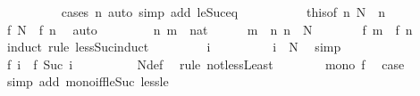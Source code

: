 \begin{isabellebody}
\ \ \ \ \ \ \ \ \isamarkupfalse%
\ {\isacharparenleft}{\kern0pt}cases\ n{\isacharparenright}{\kern0pt}\ {\isacharparenleft}{\kern0pt}auto\ simp\ add{\isacharcolon}{\kern0pt}\ le{\isacharunderscore}{\kern0pt}Suc{\isacharunderscore}{\kern0pt}eq{\isacharparenright}{\kern0pt}\isanewline
\ \ \ \ \isamarkupfalse%
\isanewline
\ \ \ \ \isamarkupfalse%
\ this{\isacharbrackleft}{\kern0pt}of\ n{\isacharbrackright}{\kern0pt}\ {\isacartoucheopen}N\ {\isasymle}\ n{\isacartoucheclose}\ \isamarkupfalse%
\ {\isachardoublequoteopen}f\ N\ {\isacharequal}{\kern0pt}\ f\ n{\isachardoublequoteclose}\ \isamarkupfalse%
\ auto\isanewline
\ \ \isamarkupfalse%
\isanewline
\ \ \ \ \isamarkupfalse%
\ n\ m\ {\isacharcolon}{\kern0pt}{\isacharcolon}{\kern0pt}\ nat\isanewline
\ \ \ \ \isamarkupfalse%
\ {\isachardoublequoteopen}m\ {\isacharless}{\kern0pt}\ n{\isachardoublequoteclose}\ {\isachardoublequoteopen}n\ {\isasymle}\ N{\isachardoublequoteclose}\isanewline
\ \ \ \ \isamarkupfalse%
\ \isamarkupfalse%
\ {\isachardoublequoteopen}f\ m\ {\isacharless}{\kern0pt}\ f\ n{\isachardoublequoteclose}\isanewline
\ \ \ \ \isamarkupfalse%
\ {\isacharparenleft}{\kern0pt}induct\ rule{\isacharcolon}{\kern0pt}\ less{\isacharunderscore}{\kern0pt}Suc{\isacharunderscore}{\kern0pt}induct{\isacharparenright}{\kern0pt}\isanewline
\ \ \ \ \ \ \isamarkupfalse%
\ {\isacharparenleft}{\kern0pt}{}\ i{\isacharparenright}{\kern0pt}\isanewline
\ \ \ \ \ \ \isamarkupfalse%
\ \isamarkupfalse%
\ {\isachardoublequoteopen}i\ {\isacharless}{\kern0pt}\ N{\isachardoublequoteclose}\ \isamarkupfalse%
\ simp\isanewline
\ \ \ \ \ \ \isamarkupfalse%
\ \isamarkupfalse%
\ {\isachardoublequoteopen}f\ i\ {\isasymnoteq}\ f\ {\isacharparenleft}{\kern0pt}Suc\ i{\isacharparenright}{\kern0pt}{\isachardoublequoteclose}\isanewline
\ \ \ \ \ \ \ \ \isamarkupfalse%
\ N{\isacharunderscore}{\kern0pt}def\ \isamarkupfalse%
\ {\isacharparenleft}{\kern0pt}rule\ not{\isacharunderscore}{\kern0pt}less{\isacharunderscore}{\kern0pt}Least{\isacharparenright}{\kern0pt}\isanewline
\ \ \ \ \ \ \isamarkupfalse%
\ {\isacartoucheopen}mono\ f{\isacartoucheclose}\ \isamarkupfalse%
\ {\isacharquery}{\kern0pt}case\ \isamarkupfalse%
\ {\isacharparenleft}{\kern0pt}simp\ add{\isacharcolon}{\kern0pt}\ mono{\isacharunderscore}{\kern0pt}iff{\isacharunderscore}{\kern0pt}le{\isacharunderscore}{\kern0pt}Suc\ less{\isacharunderscore}{\kern0pt}le{\isacharparenright}{\kern0pt}\isanewline

\end{isabellebody}
